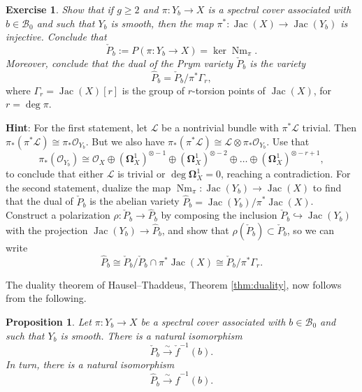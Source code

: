 \documentclass[12pt,a4paper]{amsbook}
\newtheorem{prop}[thm]{Proposition}
\theoremstyle{remark} \newtheorem{rmk}[thm]{Remark}
\theoremstyle{definition} \newtheorem{defn}[thm]{Definition}
\theoremstyle{definition} \newtheorem{ex}[thm]{Example}
\theoremstyle{definition} \newtheorem{ej}{Exercise}
\newcommand{\cB}{\mathcal B}
\newcommand{\sO}{\mathscr O}
\newcommand{\sL}{\mathscr L}
\DeclareMathOperator{\Jac}{Jac}
\DeclareMathOperator{\Nm}{Nm}
\begin{document}
\begin{ej}
\textit{Show that if $g\geq 2$ and $\pi:Y_b\rightarrow X$ is a spectral cover associated with $b\in \cB_0$ and such that $Y_b$ is smooth, then the map $\pi^*:\Jac(X)\rightarrow \Jac(Y_b)$ is injective. Conclude that}
\begin{equation*}
\check{P}_b := P(\pi:Y_b \rightarrow X) = \ker \Nm_\pi.
\end{equation*}
\textit{Moreover, conclude that the dual of the Prym variety $\check{P}_b$ is the variety}
\begin{equation*}
\hat{P}_b= \check{P}_b/\pi^* \Gamma_r,
\end{equation*}
where $\Gamma_r = \Jac(X)[r]$ is the group of $r$-torsion points of $\Jac(X)$, for $r=\deg \pi$.

\textbf{Hint}: For the first statement, let $\sL$ be a nontrivial bundle with $\pi^*\sL$ trivial. Then $\pi_*(\pi^* \sL)\cong \pi_*\sO_{Y_b}$. But we also have $\pi_*(\pi^* \sL) \cong \sL \otimes \pi_* \sO_{Y_b}$. Use that
\begin{equation*}
\pi_*(\sO_{Y_b}) \cong \sO_X \oplus (\bm{\Omega}^1_X)^{\otimes -1} \oplus (\bm{\Omega}^1_X)^{\otimes -2} \oplus \dots \oplus (\bm{\Omega}^1_X)^{\otimes -r+1},
\end{equation*}
to conclude that either $\sL$ is trivial or $\deg \bm{\Omega}^1_X = 0$, reaching a contradiction. For the second statement, dualize the map $\Nm_\pi:\Jac(Y_b)\rightarrow \Jac(X)$ to find that the dual of $\check{P}_b$ is the abelian variety $\hat{P}_b=\Jac(Y_b)/\pi^* \Jac(X)$. Construct a polarization $\rho:\check{P}_b \rightarrow \hat{P}_b$ by composing the inclusion $\check{P}_b \hookrightarrow \Jac(Y_b)$ with the projection $\Jac(Y_b)\rightarrow \hat{P}_b$, and show that $\rho(\check{P}_b)\subset \check{P}_b$, so we can write
\begin{equation*}
\hat{P}_b \cong \check{P}_b / \check{P}_b \cap \pi^* \Jac(X) \cong \check{P}_b / \pi^* \Gamma_r.
\end{equation*}
\end{ej}

The duality theorem of Hausel--Thaddeus, Theorem \ref{thm:duality}, now follows from the following.

\begin{prop}
  Let $\pi:Y_b\rightarrow X$ be a spectral cover associated with $b\in \cB_0$ and such that $Y_b$ is smooth. There is a natural isomorphism
  \begin{equation*}
\check{P}_b \overset{\sim}{\longrightarrow} \check{f}^{-1}(b).
  \end{equation*}
  In turn, there is a natural isomorphism
  \begin{equation*}
\hat{P}_b \overset{\sim}{\longrightarrow} \hat{f}^{-1}(b).
  \end{equation*}
\end{prop}
\end{document}
